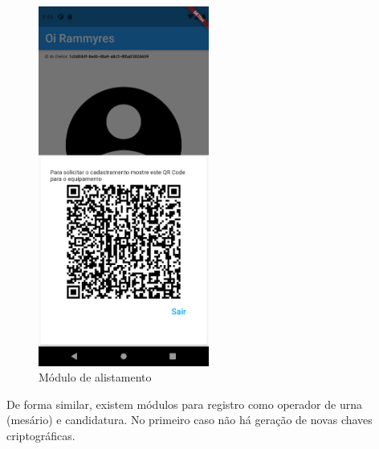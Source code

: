\begin{figure}[!htb]
	\centering
	\includegraphics[width=0.5\textwidth]{imagens/wallet2}
	\caption{Módulo de alistamento}
	\label{fig:wallet2}
\end{figure}

De forma similar, existem módulos para registro como operador de urna (mesário) e candidatura. No primeiro caso não há geração de novas chaves criptográficas. 

